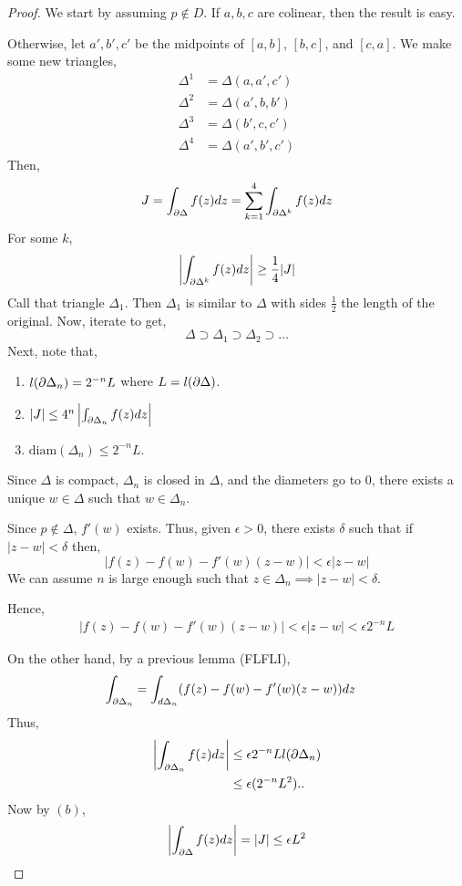 \documentclass[12pt]{amsart}
\begin{document}
\begin{proof}
    We start by assuming $p \not \in D$. If $a,b,c$ are colinear, then the result is easy.

    Otherwise, let $a', b', c'$ be the midpoints of $[a,b]$, $[b,c]$, and $[c,a]$. We make some new triangles, 
    \begin{align*}
        \Delta^1 &= \Delta(a, a', c') \\
        \Delta^2 &= \Delta(a', b, b') \\
        \Delta^3 &= \Delta(b', c, c') \\
        \Delta^4 &= \Delta(a', b', c')
    \end{align*}
    Then, \begin{align*}
        J = \int_{\partial\Delta} f(z)dz = \sum_{k=1}^4 \int_{\partial\Delta^k} f(z)dz
    \end{align*}
    For some $k$, 
    \begin{align*}
        \left|\int_{\partial \Delta^k} f(z)dz \right| \geq \frac{1}{4}|J|
    \end{align*}
    Call that triangle $\Delta_1$. Then $\Delta_1$ is similar to $\Delta$ with sides $\frac{1}{2}$ the length of the original. Now, iterate to get, 
    \[ \Delta \supset \Delta_1 \supset \Delta_2 \supset \ldots \]
    Next, note that, 
    \begin{enumerate}
        \item $l(\partial\Delta_n) = 2^{-n}L$ where $L = l(\partial\Delta)$. 
        \item $|J| \leq 4^n \left|\int_{\partial\Delta_n} f(z)dz\right|$
        \item $\text{diam}(\Delta_n) \leq 2^{-n}L$. 
    \end{enumerate}
    Since $\Delta$ is compact, $\Delta_n$ is closed in $\Delta$, and the diameters go to $0$, there exists a unique $w \in \Delta$ such that $w \in \Delta_n$.

    Since $p \not \in \Delta$, $f'(w)$ exists. Thus, given $\epsilon > 0$, there exists $\delta$ such that if $|z-w| < \delta$ then,
    \[ |f(z)-f(w) - f'(w)(z-w)| < \epsilon|z-w|\]
    We can assume $n$ is large enough such that $z \in \Delta_n \implies |z-w| < \delta$. 

    Hence, 
    \begin{align*}
        |f(z)-f(w) -f'(w)(z-w) | < \epsilon|z-w| < \epsilon 2^{-n}L
    \end{align*}

    On the other hand, by a previous lemma (FLFLI), 
    \begin{align*}
        \int_{\partial\Delta_n} &= \int_{d\Delta_n} (f(z)-f(w)-f'(w)(z-w))dz
    \end{align*}
    Thus, 
    \begin{align*}
        \left|\int_{\partial\Delta_n}f(z)dz \right| &\leq \epsilon 2^{-n}Ll(\partial\Delta_n) \\
        &\leq \epsilon(2^{-n}L^2) ..
    \end{align*}
    Now by $(b)$, 
    \begin{align*}
        \left|\int_{\partial \Delta} f(z)dz\right| = |J| \leq \epsilon L^2
    \end{align*}


\end{proof}
\end{document}
